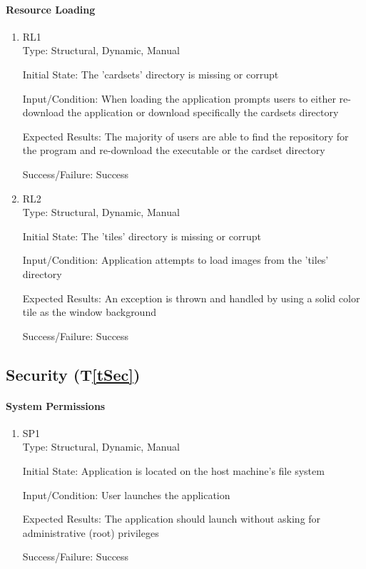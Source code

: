 \documentclass[12pt, titlepage]{article}
\newcommand{\tref}[1]{T\ref{#1}}
\begin{document}
	\paragraph{Resource Loading}
	\begin{enumerate}
		\item{RL1\\}
		Type: Structural, Dynamic, Manual
		
		Initial State: The 'cardsets' directory is missing or corrupt
		
		Input/Condition: When loading the application prompts users to either
		re-download the application or download specifically the cardsets directory
		
		Expected Results: The majority of users are able to find the repository for the
		program and re-download the executable or the cardset directory

		Success/Failure: Success
		
		\item{RL2\\}
		Type: Structural, Dynamic, Manual
		
		Initial State: The 'tiles' directory is missing or corrupt
		
		Input/Condition: Application attempts to load images from the 'tiles' directory
		
		Expected Results: An exception is thrown and handled by using a solid color tile
		as the window background

		Success/Failure: Success
	\end{enumerate}
	
	\subsection{Security (\tref{tSec})}
	\paragraph{System Permissions}
	\begin{enumerate}
		\item{SP1\\}
		Type: Structural, Dynamic, Manual
		
		Initial State: Application is located on the host machine's file system
		
		Input/Condition: User launches the application
		
		Expected Results: The application should launch without asking for administrative
		(root) privileges

		Success/Failure: Success
	\end{enumerate}
\end{document}
